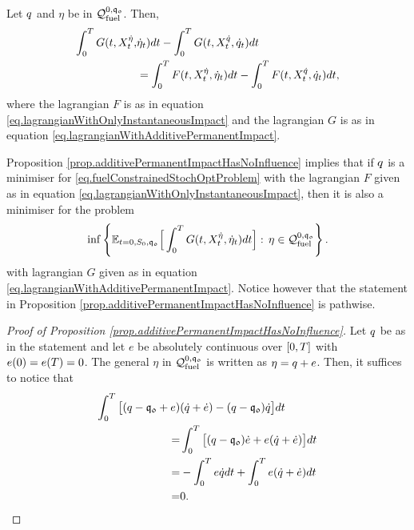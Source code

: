 \documentclass[10pt,a4paper]{article}
\begin{document}
\begin{prop}\label{prop.additivePermanentImpactHasNoInfluence}
Let $q$ and $\eta$ be in  $\mathcal{Q}_{\text{fuel}}^{0,\mathfrak{q_0}}$. Then, 
\begin{equation*}
\begin{split}
\int_{0}^{T} G(t,X^{\dot{\eta}}_t,&\dot{\eta}_t) dt - \int_{0}^{T} G(t,X^{\dot{q}}_t,\dot{q}_t) dt \\ & =
\int_{0}^{T} F(t,X^{\dot{\eta}}_t,\dot{\eta}_t) dt 
-\int_{0}^{T} F(t,X^{\dot{q}}_t,\dot{q}_t) dt,
\end{split}
\end{equation*}
where the lagrangian $F$ is as in equation \eqref{eq.lagrangianWithOnlyInstantaneousImpact} and the lagrangian  $G$ is as in equation \eqref{eq.lagrangianWithAdditivePermanentImpact}.
\end{prop}
\begin{remark}
Proposition \ref{prop.additivePermanentImpactHasNoInfluence} implies that if $q$ is a minimiser for \eqref{eq.fuelConstrainedStochOptProblem} with the lagrangian $F$ given as in equation \eqref{eq.lagrangianWithOnlyInstantaneousImpact}, then it is also a minimiser for the problem 
\begin{equation*}
\inf \left\lbrace \mathbb{{E}}_{t=0,S_0,\mathfrak{q_0}} \Big[\int_{0}^{T}
 G(t,X^{\dot{\eta}}_{t},\dot{\eta}_t) dt\Big]: \, \eta \in \mathcal{Q}_{\text{fuel}}^{0,\mathfrak{q_0}} \right\rbrace . 
\end{equation*}
with lagrangian $G$ given as in equation \eqref{eq.lagrangianWithAdditivePermanentImpact}. Notice however that the statement in Proposition \ref{prop.additivePermanentImpactHasNoInfluence} is pathwise. 
\end{remark}
\begin{proof}[Proof of Proposition \ref{prop.additivePermanentImpactHasNoInfluence}]
Let $q$ be as in the statement and let $e$ be absolutely continuous over ${[0,T]}$ with $e(0) = e(T) = 0$. The general $\eta$ in $\mathcal{Q}_{\text{fuel}}^{0,\mathfrak{q_0}}$ is written as $\eta=q+e$. Then, it suffices to notice that 
\begin{equation*}
\begin{split}
\int_{0}^{T} \big[ 
(q -\mathfrak{q_0} + e)& (\dot{q} + \dot{e})
- (q - \mathfrak{q_0})\dot{q}\big] dt \\
=& 	\int_{0}^{T} \big[(q - \mathfrak{q_0})\dot{e}
+e(\dot{q}+\dot{e})\big]dt \\
=& -\int_{0}^{T} e\dot{q} dt 
+\int_{0}^{T} e(\dot{q}+\dot{e})dt \\
=& 0. 
\end{split}
\end{equation*}
\end{proof}
\end{document}
